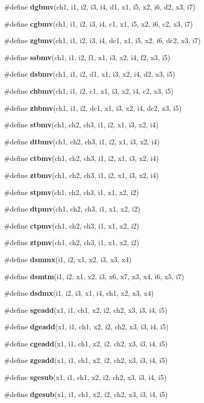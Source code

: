 \begin{CompactItemize}
\item 
\#define {\bf dgbmv}(ch1, i1, i2, i3, i4, d1, x1, i5, x2, i6, d2, x3, i7)
\item 
\#define {\bf cgbmv}(ch1, i1, i2, i3, i4, c1, x1, i5, x2, i6, c2, x3, i7)
\item 
\#define {\bf zgbmv}(ch1, i1, i2, i3, i4, dc1, x1, i5, x2, i6, dc2, x3, i7)
\item 
\#define {\bf ssbmv}(ch1, i1, i2, f1, x1, i3, x2, i4, f2, x3, i5)
\item 
\#define {\bf dsbmv}(ch1, i1, i2, d1, x1, i3, x2, i4, d2, x3, i5)
\item 
\#define {\bf chbmv}(ch1, i1, i2, c1, x1, i3, x2, i4, c2, x3, i5)
\item 
\#define {\bf zhbmv}(ch1, i1, i2, dc1, x1, i3, x2, i4, dc2, x3, i5)
\item 
\#define {\bf stbmv}(ch1, ch2, ch3, i1, i2, x1, i3, x2, i4)
\item 
\#define {\bf dtbmv}(ch1, ch2, ch3, i1, i2, x1, i3, x2, i4)
\item 
\#define {\bf ctbmv}(ch1, ch2, ch3, i1, i2, x1, i3, x2, i4)
\item 
\#define {\bf ztbmv}(ch1, ch2, ch3, i1, i2, x1, i3, x2, i4)
\item 
\#define {\bf stpmv}(ch1, ch2, ch3, i1, x1, x2, i2)
\item 
\#define {\bf dtpmv}(ch1, ch2, ch3, i1, x1, x2, i2)
\item 
\#define {\bf ctpmv}(ch1, ch2, ch3, i1, x1, x2, i2)
\item 
\#define {\bf ztpmv}(ch1, ch2, ch3, i1, x1, x2, i2)
\item 
\#define {\bf dsmmx}(i1, i2, x1, x2, i3, x3, x4)
\item 
\#define {\bf dsmtm}(i1, i2, x1, x2, i3, x6, x7, x3, x4, i6, x5, i7)
\item 
\#define {\bf dsdmx}(i1, i2, i3, x1, i4, ch1, x2, x3, x4)
\item 
\#define {\bf sgeadd}(x1, i1, ch1, x2, i2, ch2, x3, i3, i4, i5)
\item 
\#define {\bf dgeadd}(x1, i1, ch1, x2, i2, ch2, x3, i3, i4, i5)
\item 
\#define {\bf cgeadd}(x1, i1, ch1, x2, i2, ch2, x3, i3, i4, i5)
\item 
\#define {\bf zgeadd}(x1, i1, ch1, x2, i2, ch2, x3, i3, i4, i5)
\item 
\#define {\bf sgesub}(x1, i1, ch1, x2, i2, ch2, x3, i3, i4, i5)
\item 
\#define {\bf dgesub}(x1, i1, ch1, x2, i2, ch2, x3, i3, i4, i5)

\end{CompactItemize}
